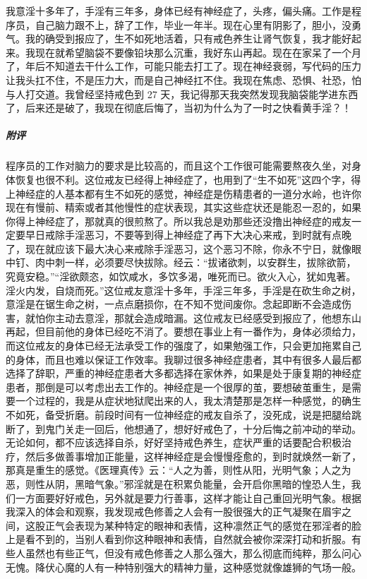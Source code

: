 \begin{case}
    我意淫十多年了，手淫有三年多，身体已经有神经症了，头疼，偏头痛。工作是程序员，自己脑力跟不上，辞了工作，毕业一年半。现在心里有阴影了，胆小，没勇气。我的确受到报应了，生不如死地活着，只有戒色养生让肾气恢复，我才能好起来。我现在就希望脑袋不要像铅块那么沉重，我好东山再起。现在在家呆了一个月了，年后不知道去干什么工作，可能只能去打工了。现在神经衰弱，写代码的压力让我头扛不住，不是压力大，而是自己神经扛不住。我现在焦虑、恐惧、社恐，怕与人打交道。我曾经坚持戒色到 27 天，我记得那天我突然发现我脑袋能学进东西了，后来还是破了，我现在彻底后悔了，当初为什么为了一时之快看黄手淫？！
    \subparagraph{附评} 程序员的工作对脑力的要求是比较高的，而且这个工作很可能需要熬夜久坐，对身体恢复也很不利。这位戒友已经得上神经症了，也用到了“生不如死”这四个字，得上神经症的人基本都有生不如死的感觉，神经症是伤精患者的一道分水岭，也许你现在有慢前、精索或者其他慢性的症状表现，其实这些症状还是能忍一忍的，如果你得上神经症了，那就真的很煎熬了。所以我总是劝那些还没撸出神经症的戒友一定要早日戒除手淫恶习，不要等到得上神经症了再下大决心来戒，到时就有点晚了，现在就应该下最大决心来戒除手淫恶习，这个恶习不除，你永不宁日，就像眼中钉、肉中刺一样，必须要尽快拔除。经云：“拔诸欲刺，以安群生，拔除欲箭，究竟安稳。”“淫欲颇恣，如饮咸水，多饮多渴，唯死而已。欲火入心，犹如鬼著。淫火内发，自烧而死。”这位戒友意淫十多年，手淫三年多，手淫是在砍生命之树，意淫是在锯生命之树，一点点磨损你，在不知不觉间废你。念起即断不会造成伤害，就怕你主动去意淫，那就会造成暗漏。这位戒友已经感受到报应了，他想东山再起，但目前他的身体已经吃不消了。要想在事业上有一番作为，身体必须给力，而这位戒友的身体已经无法承受工作的强度了，如果勉强工作，只会更加拖累自己的身体，而且也难以保证工作效率。我聊过很多神经症患者，其中有很多人最后都选择了辞职，严重的神经症患者大多都选择在家休养，如果是处于康复期的神经症患者，那倒是可以考虑出去工作的。神经症是一个很厚的茧，要想破茧重生，是需要一个过程的，我是从症状地狱爬出来的人，我太清楚那是怎样一种感觉，的确生不如死，备受折磨。前段时间有一位神经症的戒友自杀了，没死成，说是把腿给跳断了，到鬼门关走一回后，他想通了，想好好戒色了，十分后悔之前冲动的举动。无论如何，都不应该选择自杀，好好坚持戒色养生，症状严重的话要配合积极治疗，然后多做善事增加正能量，这样神经症是会慢慢痊愈的，到时就焕然一新了，那真是重生的感觉。《医理真传》云：“人之为善，则性从阳，光明气象；人之为恶，则性从阴，黑暗气象。”邪淫就是在积累负能量，会开启你黑暗的惶恐人生，我们一方面要好好戒色，另外就是要力行善事，这样才能让自己重回光明气象。根据我深入的体会和观察，我发现戒色修善之人会有一股很强大的正气凝聚在眉宇之间，这股正气会表现为某种特定的眼神和表情，这种凛然正气的感觉在邪淫者的脸上是看不到的，当别人看到你这种眼神和表情，自然就会被你深深打动和折服。有些人虽然也有些正气，但没有戒色修善之人那么强大，那么彻底而纯粹，那么问心无愧。降伏心魔的人有一种特别强大的精神力量，这种感觉就像雄狮的气场一般。
\end{case}

